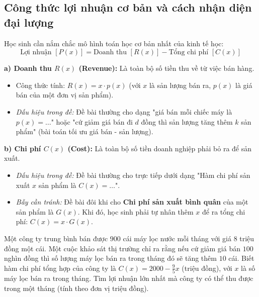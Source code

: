\documentclass[12pt]{article}
\begin{document}
	\subsection{Công thức lợi nhuận cơ bản và cách nhận diện đại lượng}
	
	Học sinh cần nắm chắc mô hình toán học cơ bản nhất của kinh tế học:
	\[ \text{Lợi nhuận } [P(x)] = \text{Doanh thu } [R(x)] - \text{Tổng chi phí } [C(x)] \]
	
	\begin{phuongphap}
		\textbf{a) Doanh thu $R(x)$ (Revenue):} Là toàn bộ số tiền thu về từ việc bán hàng.
		\begin{itemize}
			\item Công thức tính: $R(x) = x \cdot p(x)$ (với $x$ là sản lượng bán ra, $p(x)$ là giá bán của một đơn vị sản phẩm).
			\item \textit{Dấu hiệu trong đề:} Đề bài thường cho dạng "giá bán mỗi chiếc máy là $p(x) = \dots$" hoặc "cứ giảm giá bán đi $d$ đồng thì sản lượng tăng thêm $k$ sản phẩm" (bài toán tối ưu giá bán - sản lượng).
		\end{itemize}
		
		\textbf{b) Chi phí $C(x)$ (Cost):} Là toàn bộ số tiền doanh nghiệp phải bỏ ra để sản xuất.
		\begin{itemize}
			\item \textit{Dấu hiệu trong đề:} Đề bài thường cho trực tiếp dưới dạng "Hàm chi phí sản xuất $x$ sản phẩm là $C(x) = \dots$".
			\item \textit{Bẫy cần tránh:} Đề bài đôi khi cho \textbf{Chi phí sản xuất bình quân} của một sản phẩm là $G(x)$. Khi đó, học sinh phải tự nhân thêm $x$ để ra tổng chi phí: $C(x) = x \cdot G(x)$.
		\end{itemize}
	\end{phuongphap}
	
	\begin{vidu}[1]
		Một công ty trung bình bán được $900$ cái máy lọc nước mỗi tháng với giá $8$ triệu đồng một cái. Một cuộc khảo sát thị trường chỉ ra rằng nếu cứ giảm giá bán $100$ nghìn đồng thì số lượng máy lọc bán ra trong tháng đó sẽ tăng thêm $10$ cái. Biết hàm chi phí tổng hợp của công ty là $C(x) = 2000 - \frac{9}{5}x$ (triệu đồng), với $x$ là số máy lọc bán ra trong tháng. Tìm lợi nhuận lớn nhất mà công ty có thể thu được trong một tháng (tính theo đơn vị triệu đồng).
	\end{vidu}
	
\end{document}
